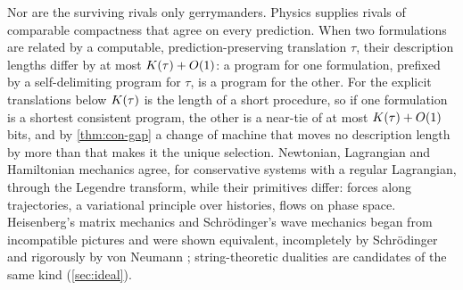 Nor are the surviving rivals only gerrymanders. Physics supplies rivals of comparable
compactness that agree on every prediction. When two formulations are related by a
computable, prediction-preserving translation $\tau$, their description lengths differ
by at most $K(\tau)+O(1)$: a program for one formulation, prefixed by a
self-delimiting program for $\tau$, is a program for the other. For the explicit
translations below $K(\tau)$ is the length of a short procedure, so if one formulation
is a shortest consistent program, the other is a near-tie of at most $K(\tau)+O(1)$
bits, and by \cref{thm:con-gap} a change of machine that moves no description length by
more than that makes it the unique selection. Newtonian, Lagrangian and Hamiltonian
mechanics agree, for conservative systems with a regular Lagrangian, through the
Legendre transform, while their primitives differ: forces along trajectories, a
variational principle over histories, flows on phase space. Heisenberg's matrix
mechanics and Schr\"odinger's wave mechanics began from incompatible pictures and were
shown equivalent, incompletely by Schr\"odinger \citep{schrodinger1926equiv} and
rigorously by von Neumann \citep{vonneumann1932}; string-theoretic dualities are
candidates of the same kind (\cref{sec:ideal}).
